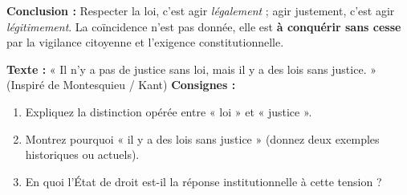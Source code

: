 \documentclass[11pt]{article}
\begin{document}
\begin{exoresolu}
\textbf{Conclusion :} Respecter la loi, c'est agir \emph{légalement} ; agir justement, c'est agir \emph{légitimement}. La coïncidence n'est pas donnée, elle est \textbf{à conquérir sans cesse} par la vigilance citoyenne et l'exigence constitutionnelle.
\end{exoresolu}

\begin{exercice}
\textbf{Texte :} « Il n'y a pas de justice sans loi, mais il y a des lois sans justice. » (Inspiré de Montesquieu / Kant)
\textbf{Consignes :}
\begin{enumerate}
    \item Expliquez la distinction opérée entre « loi » et « justice ».
    \item Montrez pourquoi « il y a des lois sans justice » (donnez deux exemples historiques ou actuels).
    \item En quoi l'État de droit est-il la réponse institutionnelle à cette tension ?
\end{enumerate}
\end{exercice}
\end{document}
